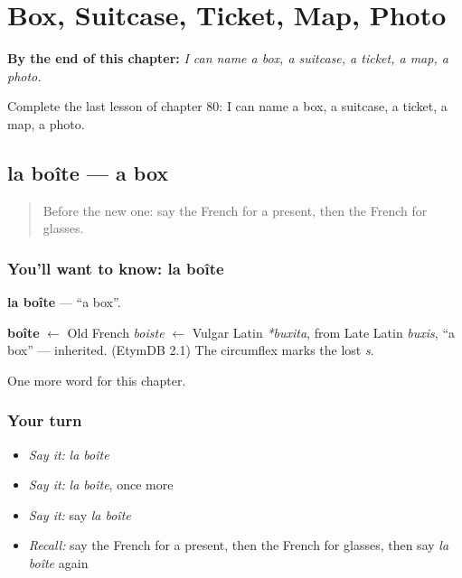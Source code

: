 
\chapter{Box, Suitcase, Ticket, Map, Photo}
\label{ch:fr-box-suitcase-ticket-map-photo}

\begin{chapteropening}
\textbf{By the end of this chapter:} \emph{I can name a box, a suitcase, a ticket, a map, a photo.}

Complete the last lesson of chapter 80: I can name a box, a suitcase, a ticket, a map, a photo.
\end{chapteropening}

\section[la boîte]{la boîte — a box}

\label{lesson:FR-C80-boite}



\begin{quote}
Before the new one: say the French for a present, then the French for glasses.
\end{quote}

\subsection*{You'll want to know: la boîte}
\textbf{la boîte} — \textquotedblleft{}a box\textquotedblright{}.

\begin{cousinweb}
\textbf{boîte} $\leftarrow$ Old French \emph{boiste} $\leftarrow$ Vulgar Latin \emph{*buxita}, from Late Latin \emph{buxis}, \textquotedblleft{}a box\textquotedblright{} — inherited. (EtymDB 2.1) The circumflex marks the lost \emph{s}.
\end{cousinweb}

\begin{grammarlens}[title={What you've built}]
One more word for this chapter.
\end{grammarlens}

\subsection*{Your turn}
\begin{itemize}
\raggedright
  \item \emph{Say it:} \emph{la boîte}
  \item \emph{Say it:} \emph{la boîte}, once more
  \item \emph{Say it:} say \emph{la boîte}
  \item \emph{Recall:} say the French for a present, then the French for glasses, then say \emph{la boîte} again
\end{itemize}

